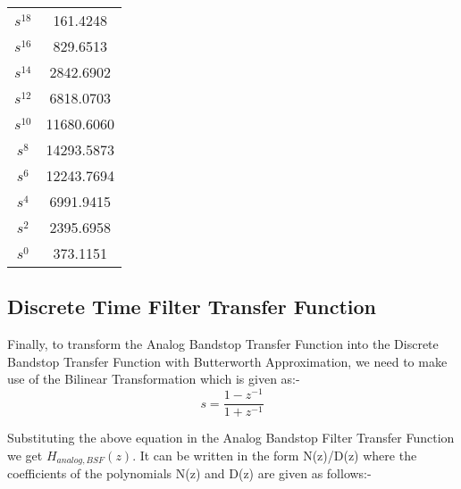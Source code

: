 \documentclass[12pt]{article}
\begin{document}
\begin{table}[H]
\begin{minipage}{.5\linewidth}
\begin{tabular}{ |c|c| }
      $s^{18}$ & 161.4248 \\
      $s^{16}$ & 829.6513 \\
      $s^{14}$ & 2842.6902 \\
      $s^{12}$ & 6818.0703 \\
      $s^{10}$ & 11680.6060 \\
      $s^{8}$ & 14293.5873 \\
      $s^{6}$ & 12243.7694 \\
      $s^{4}$ & 6991.9415 \\
      $s^{2}$ & 2395.6958 \\
      $s^{0}$ & 373.1151 \\
      \bottomrule
    \end{tabular}
  \end{minipage}
\end{table}

\newpage

\subsection{Discrete Time Filter Transfer Function}
Finally, to transform the Analog Bandstop Transfer Function into the Discrete Bandstop Transfer Function with Butterworth Approximation, we need to make use of the Bilinear Transformation which is given as:-
\[s = \frac{1 - z^{-1}}{1 + z^{-1}}\]

Substituting the above equation in the Analog Bandstop Filter Transfer Function we get $H_{analog,BSF}(z)$. It can be written in the form
N(z)/D(z) where the coefficients of the polynomials N(z) and D(z) are given as follows:-
\end{document}
